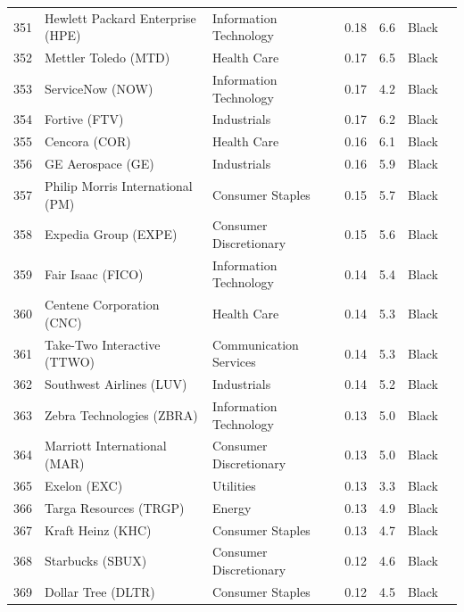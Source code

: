 \documentclass[11pt,a4paper]{article}
\begin{document}
{\begin{longtable}{r p{4.4cm} p{2.8cm} r r l l}
351 & Hewlett Packard Enterprise (HPE) & Information Technology & 0.18 & 6.6 & \cellcolor[HTML]{BFBFBF}Black &  \\
352 & Mettler Toledo (MTD) & Health Care & 0.17 & 6.5 & \cellcolor[HTML]{BFBFBF}Black &  \\
353 & ServiceNow (NOW) & Information Technology & 0.17 & 4.2 & \cellcolor[HTML]{BFBFBF}Black &  \\
354 & Fortive (FTV) & Industrials & 0.17 & 6.2 & \cellcolor[HTML]{BFBFBF}Black &  \\
355 & Cencora (COR) & Health Care & 0.16 & 6.1 & \cellcolor[HTML]{BFBFBF}Black &  \\
356 & GE Aerospace (GE) & Industrials & 0.16 & 5.9 & \cellcolor[HTML]{BFBFBF}Black &  \\
357 & Philip Morris International (PM) & Consumer Staples & 0.15 & 5.7 & \cellcolor[HTML]{BFBFBF}Black &  \\
358 & Expedia Group (EXPE) & Consumer Discretionary & 0.15 & 5.6 & \cellcolor[HTML]{BFBFBF}Black &  \\
359 & Fair Isaac (FICO) & Information Technology & 0.14 & 5.4 & \cellcolor[HTML]{BFBFBF}Black &  \\
360 & Centene Corporation (CNC) & Health Care & 0.14 & 5.3 & \cellcolor[HTML]{BFBFBF}Black &  \\
361 & Take-Two Interactive (TTWO) & Communication Services & 0.14 & 5.3 & \cellcolor[HTML]{BFBFBF}Black &  \\
362 & Southwest Airlines (LUV) & Industrials & 0.14 & 5.2 & \cellcolor[HTML]{BFBFBF}Black &  \\
363 & Zebra Technologies (ZBRA) & Information Technology & 0.13 & 5.0 & \cellcolor[HTML]{BFBFBF}Black &  \\
364 & Marriott International (MAR) & Consumer Discretionary & 0.13 & 5.0 & \cellcolor[HTML]{BFBFBF}Black &  \\
365 & Exelon (EXC) & Utilities & 0.13 & 3.3 & \cellcolor[HTML]{BFBFBF}Black &  \\
366 & Targa Resources (TRGP) & Energy & 0.13 & 4.9 & \cellcolor[HTML]{BFBFBF}Black &  \\
367 & Kraft Heinz (KHC) & Consumer Staples & 0.13 & 4.7 & \cellcolor[HTML]{BFBFBF}Black &  \\
368 & Starbucks (SBUX) & Consumer Discretionary & 0.12 & 4.6 & \cellcolor[HTML]{BFBFBF}Black &  \\
369 & Dollar Tree (DLTR) & Consumer Staples & 0.12 & 4.5 & \cellcolor[HTML]{BFBFBF}Black &  \\

\end{longtable}}
\end{document}

